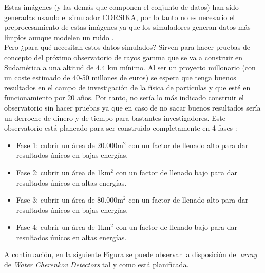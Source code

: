 Estas imágenes (y las demás que componen el conjunto de datos) han sido generadas usando el simulador CORSIKA, por lo tanto no es necesario el preprocesamiento de estas imágenes ya que los simuladores generan datos más limpios aunque modelen un ruido \cite{hapnote}.\\

Pero ¿para qué necesitan estos datos simulados? Sirven para hacer pruebas de concepto del próximo observatorio de rayos gamma que se va a construir en Sudamérica a una altitud de 4.4 km mínimo. Al ser un proyecto millonario (con un coste estimado de 40-50 millones de euros) se espera que tenga buenos resultados en el campo de investigación de la física de partículas y que esté en funcionamiento por 20 años. Por tanto, no sería lo más indicado construir el observatorio sin hacer pruebas ya que en caso de no sacar buenos resultados sería un derroche de dinero y de tiempo para bastantes investigadores. Este observatorio está planeado para ser construido completamente en 4 fases \cite{hapnote}:

\begin{itemize}
    \item Fase 1: cubrir un área de 20.000m$^2$ con un factor de llenado alto para dar resultados únicos en bajas energías.
    \item Fase 2: cubrir un área de 1km$^2$ con un factor de llenado bajo para dar resultados únicos en altas energías.
    \item Fase 3: cubrir un área de 80.000m$^2$ con un factor de llenado alto para dar resultados únicos en bajas energías.
    \item Fase 4: cubrir un área de 1km$^2$ con un factor de llenado bajo para dar resultados únicos en altas energías.
\end{itemize}

A continuación, en la siguiente Figura se puede observar la disposición del \textit{array} de \textit{Water Cherenkov Detectors} tal y como está planificada.\\

